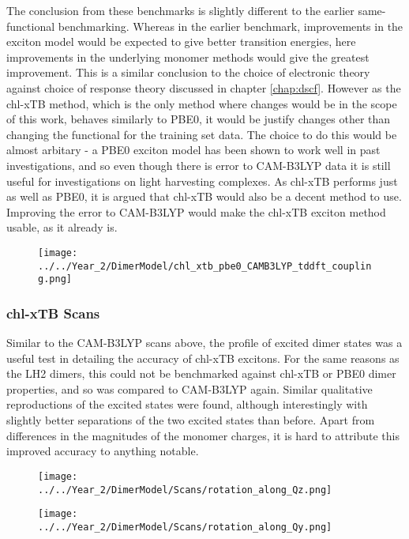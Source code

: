 The conclusion from these benchmarks is slightly different to the earlier same-functional
benchmarking. Whereas in the earlier benchmark, improvements in the exciton model
would be expected to give better transition energies, here improvements in the underlying
monomer methods would give the greatest improvement. This is a similar conclusion
to the choice of electronic theory against choice of response theory discussed in
chapter \ref{chap:dscf}. However as the chl-xTB method, which is the only method
where changes would be in the scope of this work, behaves similarly to PBE0, it 
would be justify changes other than changing the functional for the training set
data. The choice to do this would be almost arbitary - a PBE0 exciton model has
been shown to work well in past investigations, and so even though there is error
to CAM-B3LYP data it is still useful for investigations on light harvesting complexes.
As chl-xTB performs just as well as PBE0, it is argued that chl-xTB would also be
a decent method to use. Improving the error to CAM-B3LYP would make the chl-xTB
exciton method usable, as it already is. 

\begin{figure}
    \texttt{[image: ../../Year\_2/DimerModel/chl\_xtb\_pbe0\_CAMB3LYP\_tddft\_coupling.png]}
\end{figure}

\subsubsection{chl-xTB Scans}
\label{subsubsec:chl_xtb_scans}

Similar to the CAM-B3LYP scans above, the profile of excited dimer states was a useful
test in detailing the accuracy of chl-xTB excitons. For the same reasons as the
LH2 dimers, this could not be benchmarked against chl-xTB or PBE0 dimer properties,
and so was compared to CAM-B3LYP again. Similar qualitative reproductions of the
excited states were found, although interestingly with slightly better separations
of the two excited states than before. Apart from differences in the magnitudes 
of the monomer charges, it is hard to attribute this improved accuracy to anything
notable.

\begin{figure}
    \centering
    \texttt{[image: ../../Year\_2/DimerModel/Scans/rotation\_along\_Qz.png]}
\end{figure}

\begin{figure}
    \centering
    \texttt{[image: ../../Year\_2/DimerModel/Scans/rotation\_along\_Qy.png]}
\end{figure}

